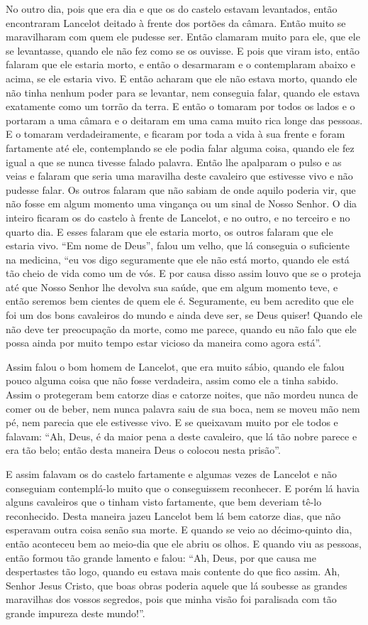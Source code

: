 No outro dia, pois que era dia e que os do castelo estavam levantados, então
encontraram Lancelot deitado à frente dos portões da câmara. Então muito se
maravilharam com quem ele pudesse ser. Então clamaram muito para ele, que ele
se levantasse, quando ele não fez como se os ouvisse. E pois que viram isto,
então falaram que ele estaria morto, e então o desarmaram e o contemplaram
abaixo e acima, se ele estaria vivo. E então acharam que ele não estava morto,
quando ele não tinha nenhum poder para se levantar, nem conseguia falar, quando
ele estava exatamente como um torrão da terra. E então o tomaram por todos os
lados e o portaram a uma câmara e o deitaram em uma cama muito rica longe das
pessoas. E o tomaram verdadeiramente, e ficaram por toda a vida à sua frente e
foram fartamente até ele, contemplando se ele podia falar alguma coisa, quando
ele fez igual a que se nunca tivesse falado palavra. Então lhe apalparam o
pulso e as veias e falaram que seria uma maravilha deste cavaleiro que
estivesse vivo e não pudesse falar. Os outros falaram que não sabiam de onde
aquilo poderia vir, que não fosse em algum momento uma vingança ou um sinal de
Nosso Senhor. O dia inteiro ficaram os do castelo à frente de
Lancelot, e no outro, e no terceiro e no quarto dia. E esses falaram que ele
estaria morto, os outros falaram que ele estaria vivo. “Em nome de Deus”, falou
um velho, que lá conseguia o suficiente na medicina, “eu vos digo seguramente
que ele não está morto, quando ele está tão cheio de vida como um de vós. E por
causa disso assim louvo que se o proteja até que Nosso Senhor lhe devolva sua
saúde, que em algum momento teve, e então seremos bem cientes de quem ele é.
Seguramente, eu bem acredito que ele foi um dos bons cavaleiros do mundo e
ainda deve ser, se Deus quiser! Quando ele não deve ter preocupação da morte,
como me parece, quando eu não falo que ele possa ainda por muito tempo estar
vicioso da maneira como agora está”. 

Assim falou o bom homem de Lancelot, que era muito sábio, quando ele falou
pouco alguma coisa que não fosse verdadeira, assim como ele a tinha sabido.
Assim o protegeram bem catorze dias e catorze noites, que não mordeu nunca de
comer ou de beber, nem nunca palavra saiu de sua boca, nem se moveu mão nem pé,
nem parecia que ele estivesse vivo. E se queixavam muito por ele todos e
falavam: “Ah, Deus, é da maior pena a deste cavaleiro, que lá tão nobre parece
e era tão belo; então desta maneira Deus o colocou nesta prisão”.

E assim falavam os do castelo fartamente e algumas vezes de Lancelot e não
conseguiam contemplá-lo muito que o conseguissem reconhecer. E porém lá havia
alguns cavaleiros que o tinham visto fartamente, que bem deveriam tê-lo
reconhecido. Desta maneira jazeu Lancelot bem lá bem catorze dias, que não
esperavam outra coisa senão sua morte. E quando se veio ao décimo-quinto dia,
então aconteceu bem ao meio-dia que ele abriu os olhos. E quando viu as
pessoas, então formou tão grande lamento e falou: “Ah, Deus, por que causa me
despertastes tão logo, quando eu estava mais contente do que fico assim. Ah,
Senhor Jesus Cristo, que boas obras poderia aquele que lá soubesse as grandes
maravilhas dos vossos segredos, pois que minha visão foi paralisada com tão
grande impureza deste mundo!”.

